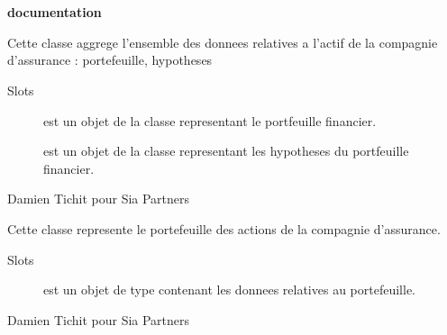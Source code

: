 \documentclass[a4paper]{book}
\begin{document}
\chapter*{}
\begin{center}
{\textbf{\huge \R{} documentation}} \par{}
\par\bigskip{\large \today}
\end{center}
%
\begin{Description}\relax
Cette classe aggrege l'ensemble des donnees relatives a l'actif de la compagnie d'assurance : portefeuille, hypotheses
\end{Description}
%
\begin{Section}{Slots}

\begin{description}

\item[] est un objet de la classe  representant le portfeuille financier.

\item[] est un objet de la classe  representant les hypotheses du portfeuille financier.

\end{description}
\end{Section}
%
\begin{Author}\relax
Damien Tichit pour Sia Partners
\end{Author}
%
\begin{Description}\relax
Cette classe represente le portefeuille des actions de la compagnie d'assurance.
\end{Description}
%
\begin{Section}{Slots}

\begin{description}

\item[] est un objet de type  contenant les donnees relatives au portefeuille.

\end{description}
\end{Section}
%
\begin{Author}\relax
Damien Tichit pour Sia Partners
\end{Author}
\end{document}
